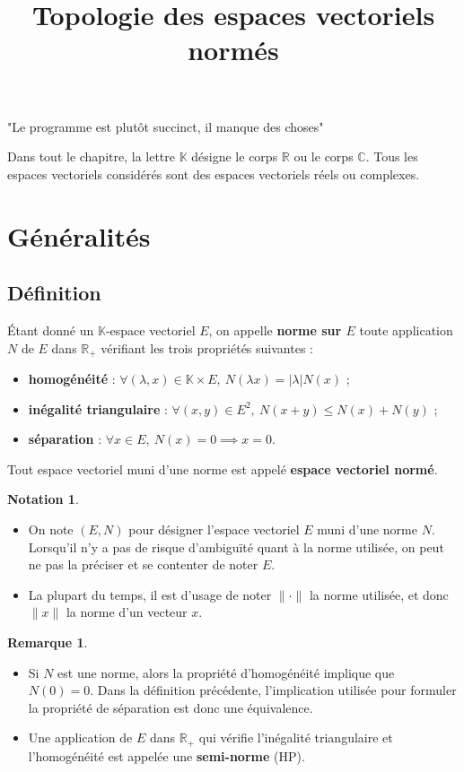 \documentclass[french]{article}
\title{Topologie des espaces vectoriels normés}
\date{}
\newcommand{\R}{\mathbb{R}}
\newcommand{\C}{\mathbb{C}}
\newcommand{\K}{\mathbb{K}}
\theoremstyle{plain}
\theoremstyle{definition}
\newtheorem*{rmq}{Remarque}
\newtheorem*{notation}{Notation}
\theoremstyle{remark}
\begin{document}
\tableofcontents
"Le  programme est plutôt succinct, il manque des choses"

\newpage
\maketitle

Dans tout le chapitre, la lettre $\K$ désigne le corps $\R$ ou le corps $\C$. Tous les espaces vectoriels considérés sont des espaces vectoriels réels ou complexes.

\section{Généralités}

\subsection{Définition}

\begin{dfn}
	Étant donné un $\K$-espace vectoriel $E$, on appelle \textbf{norme sur $E$} toute application $N$ de $E$ dans $\R_+$ vérifiant les trois propriétés suivantes :
	\begin{itemize}
		\item \textbf{homogénéité} : $\forall (\lambda,x)\in\K\times E,\ N(\lambda x)=\lvert\lambda\rvert N(x)$ ;
		\item \textbf{inégalité triangulaire} : $\forall (x,y)\in E^2,\ N(x+y)\leqslant N(x)+N(y)$ ;
		\item \textbf{séparation} : $\forall x\in E,\ N(x)=0\implies x=0$.
	\end{itemize}
	Tout espace vectoriel muni d'une norme est appelé \textbf{espace vectoriel normé}.
\end{dfn}


\begin{notation}
	\begin{itemize}
		\item On note $(E,N)$ pour désigner l'espace vectoriel $E$ muni d'une norme $N$. Lorsqu'il n'y a pas de risque d'ambiguïté quant à la norme utilisée, on peut ne pas la préciser et se contenter de noter $E$.
		\item La plupart du temps, il est d'usage de noter $\lVert \cdot\rVert$ la norme utilisée, et donc $\lVert x\rVert$ la norme d'un vecteur $x$.
	\end{itemize}
\end{notation}

\begin{rmq}
	\begin{itemize}
		\item Si $N$ est une norme, alors la propriété d'homogénéité implique que $N(0)=0$. Dans la définition précédente, l'implication utilisée pour formuler la propriété de séparation est donc une équivalence.
		\item Une application de $E$ dans $\R_+$ qui vérifie l'inégalité triangulaire et l'homogénéité est appelée une \textbf{semi-norme} (HP).
	\end{itemize}
\end{rmq}
\end{document}
